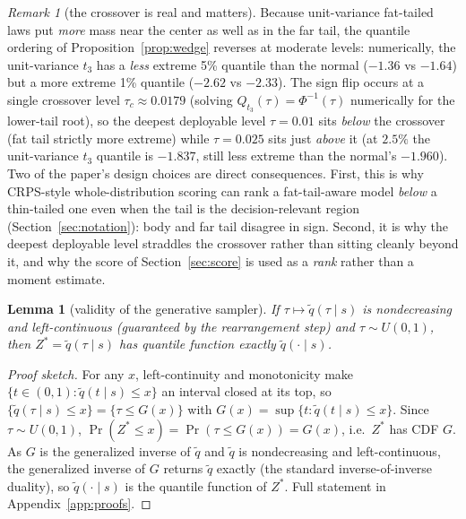 \documentclass[11pt]{article}
\newtheorem{lemma}{Lemma}
\theoremstyle{remark}
\newtheorem{remark}{Remark}
\begin{document}
\begin{remark}[the crossover is real and matters]\label{rem:crossover}
Because unit-variance fat-tailed laws put \emph{more} mass near the
center as well as in the far tail, the quantile ordering of
Proposition~\ref{prop:wedge} reverses at moderate levels: numerically,
the unit-variance $t_3$ has a \emph{less} extreme 5\% quantile than the
normal ($-1.36$ vs $-1.64$) but a more extreme 1\% quantile ($-2.62$ vs
$-2.33$). The sign flip occurs at a single crossover level
$\tau_c \approx 0.0179$ (solving $Q_{t_3}(\tau)=\Phi^{-1}(\tau)$
numerically for the lower-tail root), so the deepest deployable level
$\tau = 0.01$ sits \emph{below} the crossover (fat tail strictly more
extreme) while $\tau = 0.025$ sits just \emph{above} it (at $2.5\%$ the
unit-variance $t_3$ quantile is $-1.837$, still less extreme than the
normal's $-1.960$). Two of the paper's design choices are direct
consequences. First, this is why CRPS-style whole-distribution
scoring can rank a fat-tail-aware model \emph{below} a thin-tailed one
even when the tail is the decision-relevant region
(Section~\ref{sec:notation}): body and far tail disagree in sign.
Second, it is why the deepest deployable level straddles the crossover
rather than sitting cleanly beyond it, and why the score of
Section~\ref{sec:score} is used as a \emph{rank} rather than a moment
estimate.
\end{remark}

\begin{lemma}[validity of the generative sampler]\label{lem:sampler}
If $\tau \mapsto \widetilde{q}(\tau \mid s)$ is nondecreasing and
left-continuous (guaranteed by the rearrangement step) and
$\tau \sim U(0,1)$, then $Z^* = \widetilde{q}(\tau \mid s)$ has
quantile function exactly $\widetilde{q}(\cdot \mid s)$.
\end{lemma}
\begin{proof}[Proof sketch]
For any $x$, left-continuity and monotonicity make
$\{t\in(0,1):\widetilde{q}(t\mid s)\le x\}$ an interval closed at its
top, so $\{\widetilde q(\tau\mid s)\le x\}=\{\tau\le G(x)\}$ with
$G(x)=\sup\{t:\widetilde q(t\mid s)\le x\}$. Since $\tau\sim U(0,1)$,
$\Pr(Z^*\le x)=\Pr(\tau\le G(x))=G(x)$, i.e.\ $Z^*$ has CDF $G$. As $G$
is the generalized inverse of $\widetilde q$ and $\widetilde q$ is
nondecreasing and left-continuous, the generalized inverse of $G$
returns $\widetilde q$ exactly (the standard inverse-of-inverse
duality), so $\widetilde q(\cdot\mid s)$ is the quantile function of
$Z^*$. Full statement in Appendix~\ref{app:proofs}.
\end{proof}
\end{document}
